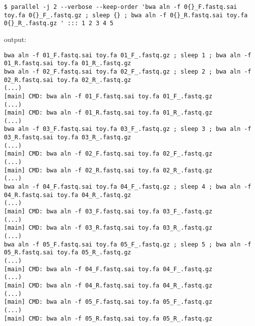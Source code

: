 \documentclass{article}
\begin{document}
\begin{lstlisting}
$ parallel -j 2 --verbose --keep-order 'bwa aln -f 0{}_F.fastq.sai toy.fa 0{}_F_.fastq.gz ; sleep {} ; bwa aln -f 0{}_R.fastq.sai toy.fa 0{}_R_.fastq.gz ' ::: 1 2 3 4 5
\end{lstlisting}
output:
\begin{lstlisting}
bwa aln -f 01_F.fastq.sai toy.fa 01_F_.fastq.gz ; sleep 1 ; bwa aln -f 01_R.fastq.sai toy.fa 01_R_.fastq.gz 
bwa aln -f 02_F.fastq.sai toy.fa 02_F_.fastq.gz ; sleep 2 ; bwa aln -f 02_R.fastq.sai toy.fa 02_R_.fastq.gz 
(...)
[main] CMD: bwa aln -f 01_F.fastq.sai toy.fa 01_F_.fastq.gz
(...)
[main] CMD: bwa aln -f 01_R.fastq.sai toy.fa 01_R_.fastq.gz
(...)
bwa aln -f 03_F.fastq.sai toy.fa 03_F_.fastq.gz ; sleep 3 ; bwa aln -f 03_R.fastq.sai toy.fa 03_R_.fastq.gz 
(...)
[main] CMD: bwa aln -f 02_F.fastq.sai toy.fa 02_F_.fastq.gz
(...)
[main] CMD: bwa aln -f 02_R.fastq.sai toy.fa 02_R_.fastq.gz
(...)
bwa aln -f 04_F.fastq.sai toy.fa 04_F_.fastq.gz ; sleep 4 ; bwa aln -f 04_R.fastq.sai toy.fa 04_R_.fastq.gz 
(...)
[main] CMD: bwa aln -f 03_F.fastq.sai toy.fa 03_F_.fastq.gz
(...)
[main] CMD: bwa aln -f 03_R.fastq.sai toy.fa 03_R_.fastq.gz
(...)
bwa aln -f 05_F.fastq.sai toy.fa 05_F_.fastq.gz ; sleep 5 ; bwa aln -f 05_R.fastq.sai toy.fa 05_R_.fastq.gz 
(...)
[main] CMD: bwa aln -f 04_F.fastq.sai toy.fa 04_F_.fastq.gz
(...)
[main] CMD: bwa aln -f 04_R.fastq.sai toy.fa 04_R_.fastq.gz
(...)
[main] CMD: bwa aln -f 05_F.fastq.sai toy.fa 05_F_.fastq.gz
(...)
[main] CMD: bwa aln -f 05_R.fastq.sai toy.fa 05_R_.fastq.gz
\end{lstlisting}
\end{document}
